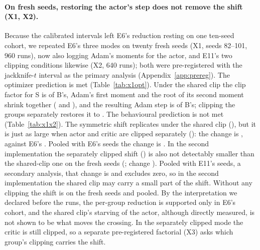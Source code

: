 

\paragraph{On fresh seeds, restoring the actor's step does not remove the shift (X1, X2).}
Because the calibrated intervals left E6's reduction resting on one ten-seed cohort, we repeated E6's three modes on
twenty fresh seeds (X1, seeds 82--101, 960 runs), now also logging Adam's moments for the actor, and E11's two
clipping conditions likewise (X2, 640 runs); both were pre-registered with the jackknife-$t$ interval as the primary
analysis (Appendix~\ref{app:prereg}). The optimizer prediction is met (Table~\ref{tab:x1opt}). Under the shared clip
the clip factor for S is \VxoKappa{} of B's, Adam's first moment and the root of its second moment shrink together
(\VxoGlobM{} and \VxoGlobV{}), and the resulting Adam step is \VxoGlobStep{} of B's; clipping the groups separately
restores it to \VxoGroupStep{}. The behavioural prediction is not met (Table~\ref{tab:x1x2}). The symmetric shift
replicates under the shared clip (\VxFGlob{}), but it is just as large when actor and critic are clipped separately
(\VxFGroup{}): the change is \VxFCh{}, against E6's \VjtChSix{}. Pooled with E6's seeds the change is \VxPCh{}. In the
second implementation the separately clipped shift (\VxFTwoGroup{}) is also not detectably smaller than the shared-clip
one on the fresh seeds (\VxFTwoRaw{}; change \VxFTwoCh{}). Pooled with E11's seeds, a secondary analysis, that change is
\VxPTwoCh{} and excludes zero, so in the second implementation the shared clip may carry a small part of the shift. Without any clipping the shift is \VxFNone{} on the fresh
seeds and \VxPNone{} pooled. By the interpretation we declared before the runs, the per-group reduction is supported
only in E6's cohort, and the shared clip's starving of the actor, although directly measured, is not shown to be what
moves the crossing. In the separately clipped mode the critic is still clipped, so a separate pre-registered factorial
(X3) asks which group's clipping carries the shift.




